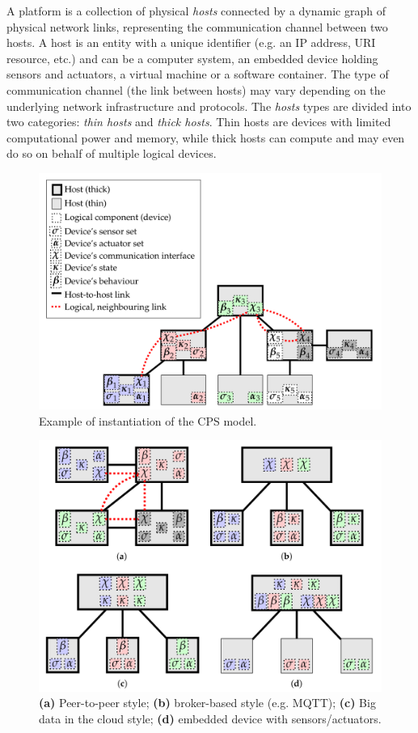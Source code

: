 A platform is a collection of physical \emph{hosts} connected by a dynamic graph of physical network links, representing the communication channel
between two hosts. A host is an entity with a unique identifier (e.g. an IP address, URI resource, etc.) and can be a computer system, an embedded
device holding sensors and actuators, a virtual machine or a software container. The type of communication channel (the link between hosts) may
vary depending on the underlying network infrastructure and protocols.
The \emph{hosts} types are divided into two categories: \emph{thin hosts} and \emph{thick hosts}. Thin hosts are devices with limited computational
power and memory, while thick hosts can compute and may even do so on behalf of multiple logical devices.

\begin{figure}
	\centering
	\includegraphics[width=0.7\linewidth]{figures/cps-example.png}
	\caption{Example of instantiation of the CPS model.}
	\label{fig:cps-example}
\end{figure}

\begin{figure}
	\centering
	\includegraphics[width=0.7\linewidth]{figures/notable-deployments.png}
	\caption{\textbf{(a)} Peer-to-peer style; \textbf{(b)} broker-based style (e.g. MQTT); \textbf{(c)} Big data in the cloud style; \textbf{(d)} embedded device with sensors/actuators.}
	\label{fig:notable-deployments}
\end{figure}

